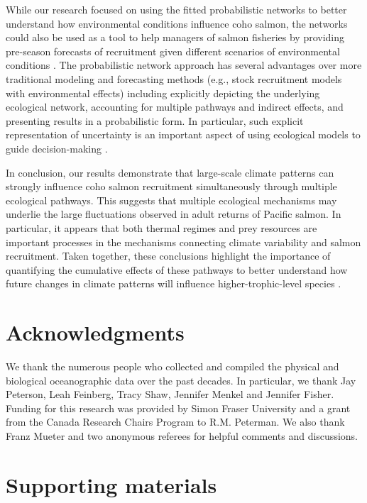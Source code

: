 While our research focused on using the fitted probabilistic networks to better
understand how environmental conditions influence coho salmon, the networks
could also be used as a tool to help managers of salmon fisheries by providing
pre-season forecasts of recruitment given different scenarios of environmental
conditions \citep{Nyberg2006a, Araujo2013}. The probabilistic network approach
has several advantages over more traditional modeling and forecasting methods
(e.g., stock recruitment models with environmental effects) including explicitly
depicting the underlying ecological network, accounting for multiple pathways
and indirect effects, and presenting results in a probabilistic form. In
particular, such explicit representation of uncertainty is an important aspect
of using ecological models to guide decision-making \citep{Clark2001a}.

In conclusion, our results demonstrate that large-scale climate patterns can
strongly influence coho salmon recruitment simultaneously through multiple
ecological pathways. This suggests that multiple ecological mechanisms may
underlie the large fluctuations observed in adult returns of Pacific salmon. In
particular, it appears that both thermal regimes and prey resources are
important processes in the mechanisms connecting climate variability and salmon
recruitment. Taken together, these conclusions highlight the importance of
quantifying the cumulative effects of these pathways to better understand how
future changes in climate patterns will influence higher-trophic-level species
\citep{Ainsworth2011a, Fulton2011}.



\section{Acknowledgments}

We thank the numerous people who collected and compiled the physical and
biological oceanographic data over the past decades. In particular, we thank Jay
Peterson, Leah Feinberg, Tracy Shaw, Jennifer Menkel and Jennifer Fisher.
Funding for this research was provided by Simon Fraser University and a grant
from the Canada Research Chairs Program to R.M.  Peterman. We also thank Franz
Mueter and two anonymous referees for helpful comments and discussions.



\section{Supporting materials}

